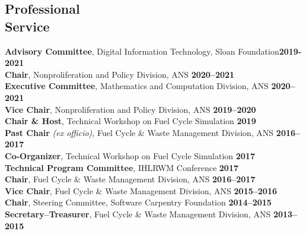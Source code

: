 \documentclass[margin,line]{resume}
\begin{document}
\begin{resume}
    \section{\mysidestyle Professional\\Service}
    \textbf{Advisory Committee}, Digital Information Technology, Sloan 
    Foundation\hfill\textbf{2019-2021}\vspace{.5mm}\\%
                \textbf{Chair}, Nonproliferation and Policy Division, ANS  \hfill \textbf{2020--2021}\vspace{.5mm}\\%
                \textbf{Executive Committee}, Mathematics and Computation Division, ANS  \hfill \textbf{2020--2021}\vspace{.5mm}\\%
                \textbf{Vice Chair}, Nonproliferation and Policy Division, ANS  \hfill \textbf{2019--2020}\vspace{.5mm}\\%
                \textbf{Chair \& Host}, Technical Workshop on Fuel Cycle Simulation \hfill \textbf{2019}\vspace{.5mm}\\%
    \textbf{Past Chair} \emph{(ex officio)}, Fuel Cycle \& Waste Management Division, ANS  \hfill \textbf{2016--2017}\vspace{.5mm}\\%
                \textbf{Co-Organizer}, Technical Workshop on Fuel Cycle Simulation \hfill \textbf{2017}\vspace{.5mm}\\%
                \textbf{Technical Program Committee}, IHLRWM Conference \hfill \textbf{2017}\vspace{.5mm}\\%
                \textbf{Chair}, Fuel Cycle \& Waste Management Division, ANS  \hfill \textbf{2016--2017}\vspace{.5mm}\\%
                \textbf{Vice Chair}, Fuel Cycle \& Waste Management Division, ANS  \hfill \textbf{2015--2016}\vspace{.5mm}\\%
                \textbf{Chair}, Steering Committee, Software Carpentry Foundation   \hfill \textbf{2014--2015}\vspace{.5mm}\\%
                \textbf{Secretary--Treasurer}, Fuel Cycle \& Waste Management Division, ANS  \hfill \textbf{2013--2015}\vspace{.5mm}\\%

\end{resume}
\end{document}
